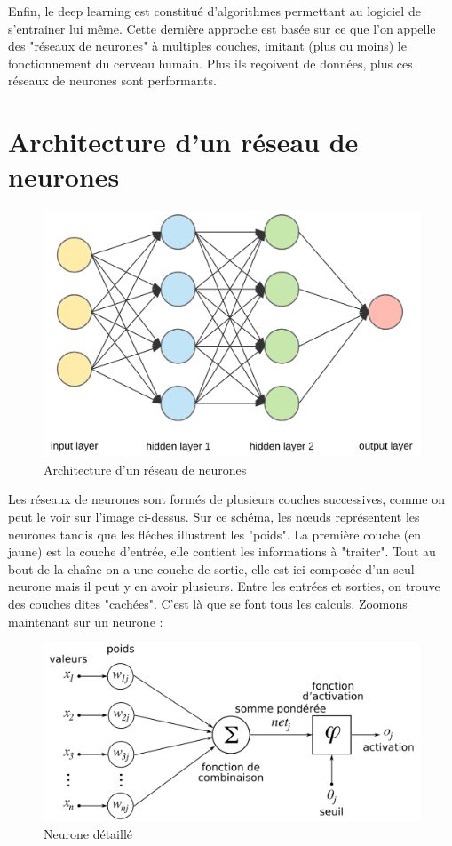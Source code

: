 	Enfin, le deep learning est constitué d'algorithmes permettant au logiciel de s'entrainer lui même. Cette dernière approche est basée sur ce que l'on appelle des "réseaux de neurones" à multiples couches, imitant (plus ou moins) le fonctionnement du cerveau humain. Plus ils reçoivent de données, plus ces réseaux de neurones sont performants. 
	
\section{Architecture d'un réseau de neurones}

	\begin{figure}[H]
		\centering
		\includegraphics[width=0.75\linewidth]{images/reseau}
		\caption{Architecture d'un réseau de neurones}
	\end{figure}

	Les réseaux de neurones sont formés de plusieurs couches successives, comme on peut le voir sur l'image ci-dessus. Sur ce schéma, les n\oe uds représentent les neurones tandis que les fléches illustrent les "poids". La première couche (en jaune) est la couche d'entrée, elle contient les informations à "traiter". Tout au bout de la chaîne on a une couche de sortie, elle est ici composée d'un seul neurone mais il peut y en avoir plusieurs. Entre les entrées et sorties, on trouve des couches dites "cachées". C'est là que se font tous les calculs. Zoomons maintenant sur un neurone : \\
	
	\begin{figure}[H]
		\centering
		\includegraphics[width=.75\linewidth]{images/neurone}
		\caption{Neurone détaillé}
	\end{figure}
	
